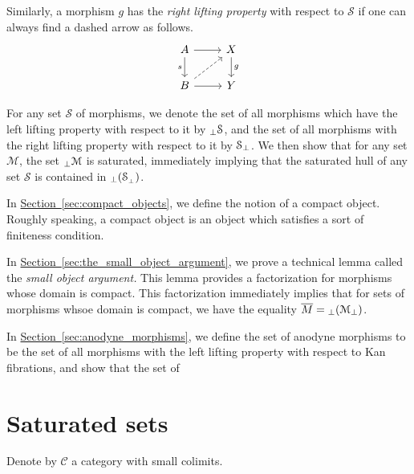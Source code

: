 \documentclass[main.tex]{subfiles}
\begin{document}
Similarly, a morphism $g$ has the \emph{right lifting property} with respect to $\mathcal{S}$ if one can always find a dashed arrow as follows.
\begin{equation*}
  \begin{tikzcd}
    A
    \arrow[r]
    \arrow[d, swap, "s"]
    & X
    \arrow[d, "g"]
    \\
    B
    \arrow[r]
    \arrow[ur, dashed]
    & Y
  \end{tikzcd}
\end{equation*}

For any set $\mathcal{S}$ of morphisms, we denote the set of all morphisms which have the left lifting property with respect to it by ${}_{\perp}\mathcal{S}$, and the set of all morphisms with the right lifting property with respect to it by $\mathcal{S}_{\perp}$. We then show that for any set $\mathcal{M}$, the set ${}_{\perp}\mathcal{M}$ is saturated, immediately implying that the saturated hull of any set $\mathcal{S}$ is contained in ${}_{\perp}(\mathcal{S}_{_{\perp}})$.

In \hyperref[sec:compact_objects]{Section~\ref*{sec:compact_objects}}, we define the notion of a compact object. Roughly speaking, a compact object is an object which satisfies a sort of finiteness condition.

In \hyperref[sec:the_small_object_argument]{Section~\ref*{sec:the_small_object_argument}}, we prove a technical lemma called the \emph{small object argument.} This lemma provides a factorization for morphisms whose domain is compact. This factorization immediately implies that for sets of morphisms whsoe domain is compact, we have the equality $\overline{M} = {}_{\perp}(\mathcal{M}_{\perp})$.

In \hyperref[sec:anodyne_morphisms]{Section~\ref*{sec:anodyne_morphisms}}, we define the set of anodyne morphisms to be the set of all morphisms with the left lifting property with respect to Kan fibrations, and show that the set of

\section{Saturated sets}
\label{sec:saturated_sets}

Denote by $\mathcal{C}$ a category with small colimits.
\end{document}
